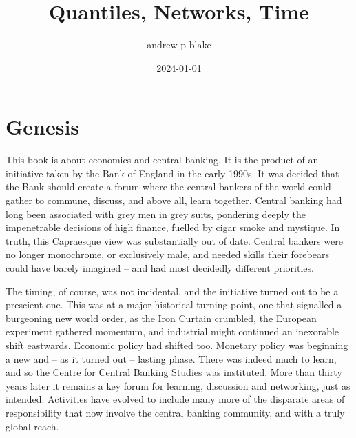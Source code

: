 \documentclass[
  letterpaper,
]{book}
\title{Quantiles, Networks, Time}
\author{andrew p blake}
\date{2024-01-01}
\renewcommand*\contentsname{Table of contents}
\newcommand\contentsname{Table of contents}
\begin{document}
\frontmatter
\maketitle
\ifdefined\Shaded\renewenvironment{Shaded}{\begin{tcolorbox}[breakable, boxrule=0pt, enhanced, frame hidden, interior hidden, sharp corners, borderline west={3pt}{0pt}{shadecolor}]}{\end{tcolorbox}}\fi

\renewcommand*\contentsname{Table of contents}
{
\setcounter{tocdepth}{2}
\tableofcontents
}
\mainmatter
{}

\hypertarget{sec-genesis}{%
\chapter*{Genesis}\label{sec-genesis}}


This book is about economics and central banking. It is the product of
an initiative taken by the Bank of England in the early 1990s. It was
decided that the Bank should create a forum where the central bankers of
the world could gather to commune, discuss, and above all, learn
together. Central banking had long been associated with grey men in grey
suits, pondering deeply the impenetrable decisions of high finance,
fuelled by cigar smoke and mystique. In truth, this Capraesque view was
substantially out of date. Central bankers were no longer monochrome, or
exclusively male, and needed skills their forebears could have barely
imagined -- and had most decidedly different priorities.

The timing, of course, was not incidental, and the initiative turned out
to be a prescient one. This was at a major historical turning point, one
that signalled a burgeoning new world order, as the Iron Curtain
crumbled, the European experiment gathered momentum, and industrial
might continued an inexorable shift eastwards. Economic policy had
shifted too. Monetary policy was beginning a new and -- as it turned out
-- lasting phase. There was indeed much to learn, and so the Centre for
Central Banking Studies was instituted. More than thirty years later it
remains a key forum for learning, discussion and networking, just as
intended. Activities have evolved to include many more of the disparate
areas of responsibility that now involve the central banking community,
and with a truly global reach.
\end{document}
